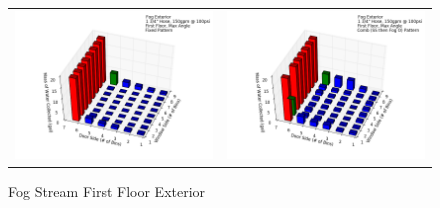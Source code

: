 \documentclass{article}
\begin{document}
\begin{appendices}
\begin{figure}[ht]
\begin{tabular*}{\textwidth}{lr}
\includegraphics[width=3.2in]{../ADD_Analysis/Figures/15-12-08_121806_Datafile_Fog_Exterior.png} &
\includegraphics[width=3.2in]{../ADD_Analysis/Figures/15-12-08_122239_Datafile_Fog_Exterior.png} \\
\end{tabular*}
\caption{Fog Stream First Floor Exterior}
\label{fig:Fog Stream First Floor Exterior}
\end{figure}

\clearpage


\end{appendices}
\end{document}
